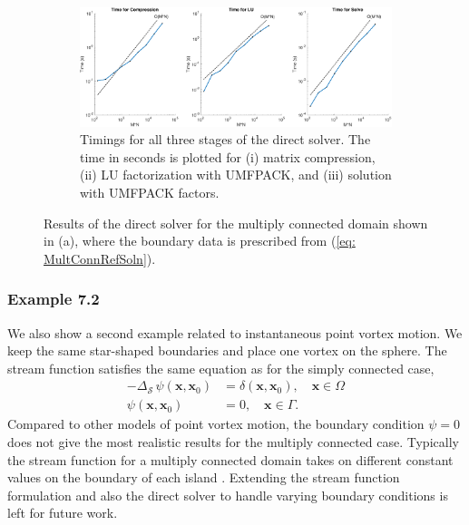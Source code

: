 \documentclass{sfuthesis}
\begin{document}
\begin{figure}[h]
\begin{subfigure}[b]{0.45\textwidth}
             	\label{fig: Ex7-1TwoStarsError}
  	\end{subfigure}
        ~ 
        \begin{subfigure}{\textwidth}
        	\vspace{1cm}
                \includegraphics[width=\textwidth]{Ex7-1TwoStarsTime}
                \caption{Timings for all three stages of the direct solver. The time in seconds is plotted for (i) matrix compression, (ii) LU factorization with UMFPACK, and (iii) solution with UMFPACK factors.}
   		\label{fig: Ex7-1TwoStarsTime}
    	\end{subfigure}
    	\caption{Results of the direct solver for the multiply connected domain shown in (a), where the boundary data is prescribed from (\ref{eq: MultConnRefSoln}).}
\end{figure}
  

 \subsubsection{Example 7.2} 
We also show a second example related to instantaneous point vortex motion. We keep the same star-shaped boundaries and place one vortex on the sphere.
The stream function satisfies the same equation as for the simply connected case, 
\begin{align*}
	-\Delta_{\mathcal{S} \ } \psi(\mathbf{x}, \mathbf{x}_0)&=\delta(\mathbf{x},\mathbf{x}_0), \quad \mathbf{x} \in \Omega\\
	\psi(\mathbf{x}, \mathbf{x}_0)&=0, \quad \mathbf{x} \in \Gamma.
\end{align*}
Compared to other models of point vortex motion, the boundary condition $\psi=0$ does not give the most realistic results for the multiply connected case. Typically the stream function for a multiply connected domain takes on different constant values on the boundary of each island \cite{SurCrow2008, Lin41}. Extending the stream function formulation and also the direct solver to handle varying boundary conditions is left for future work. 
 
\end{document}
